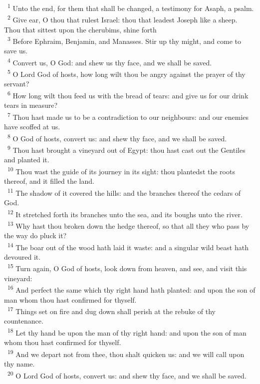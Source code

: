 \documentclass[a5paper,12pt]{article}
\begin{document}
\begin{multicols*}{2}
~\textsuperscript{1} Unto the end, for them that shall be changed, a testimony for Asaph, a psalm.\\
~\textsuperscript{2} Give ear, O thou that rulest Israel: thou that leadest Joseph like a sheep. Thou that sittest upon the cherubims, shine forth\\
~\textsuperscript{3} Before Ephraim, Benjamin, and Manasses. Stir up thy might, and come to save us.\\
~\textsuperscript{4} Convert us, O God: and shew us thy face, and we shall be saved.\\
~\textsuperscript{5} O Lord God of hosts, how long wilt thou be angry against the prayer of thy servant?\\
~\textsuperscript{6} How long wilt thou feed us with the bread of tears: and give us for our drink tears in measure?\\
~\textsuperscript{7} Thou hast made us to be a contradiction to our neighbours: and our enemies have scoffed at us.\\
~\textsuperscript{8} O God of hosts, convert us: and shew thy face, and we shall be saved.\\
~\textsuperscript{9} Thou hast brought a vineyard out of Egypt: thou hast cast out the Gentiles and planted it.\\
~\textsuperscript{10} Thou wast the guide of its journey in its sight: thou plantedst the roots thereof, and it filled the land.\\
~\textsuperscript{11} The shadow of it covered the hills: and the branches thereof the cedars of God.\\
~\textsuperscript{12} It stretched forth its branches unto the sea, and its boughs unto the river.\\
~\textsuperscript{13} Why hast thou broken down the hedge thereof, so that all they who pass by the way do pluck it?\\
~\textsuperscript{14} The boar out of the wood hath laid it waste: and a singular wild beast hath devoured it.\\
~\textsuperscript{15} Turn again, O God of hosts, look down from heaven, and see, and visit this vineyard:\\
~\textsuperscript{16} And perfect the same which thy right hand hath planted: and upon the son of man whom thou hast confirmed for thyself.\\
~\textsuperscript{17} Things set on fire and dug down shall perish at the rebuke of thy countenance.\\
~\textsuperscript{18} Let thy hand be upon the man of thy right hand: and upon the son of man whom thou hast confirmed for thyself.\\
~\textsuperscript{19} And we depart not from thee, thou shalt quicken us: and we will call upon thy name.\\
~\textsuperscript{20} O Lord God of hosts, convert us: and shew thy face, and we shall be saved.\\


\end{multicols*}
\end{document}
